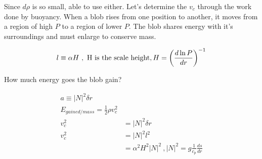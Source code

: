 Since $d\rho$ is so small, able to use either. Let's determine the $v_c$ through the work done by buoyancy. When a blob rises from one position to another, it moves from a region of high $P$ to a region of lower $P$. The blob shares energy with it's surroundings and must enlarge to conserve mass. 

\begin{align}
l \equiv \alpha H~,\text{ H is the scale height},H = \left( \frac{d \ln P}{dr} \right)^{-1}
\end{align}

How much energy goes the blob gain?

\begin{align}
a \equiv |N|^2\delta r\\
E_{gained/mass} = \frac{1}{2}\rho v_c^2\\
v_c^2 &= |N|^2 \delta r\\
v_c^2 &= |N|^2l^2\\
&= \alpha^2 H^2 |N|^2~,|N|^2 = g\frac{1}{c_p} \frac{ds}{dr}
\end{align}
